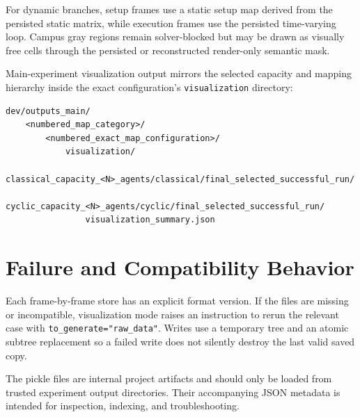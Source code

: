 \documentclass[11pt]{article}
\begin{document}
For dynamic branches, setup frames use a static setup map derived from the persisted static matrix, while execution frames use the persisted time-varying loop. Campus gray regions remain solver-blocked but may be drawn as visually free cells through the persisted or reconstructed render-only semantic mask.

Main-experiment visualization output mirrors the selected capacity and mapping hierarchy inside the exact configuration's \texttt{visualization} directory:
\begin{lstlisting}
dev/outputs_main/
    <numbered_map_category>/
        <numbered_exact_map_configuration>/
            visualization/
                classical_capacity_<N>_agents/classical/final_selected_successful_run/
                cyclic_capacity_<N>_agents/cyclic/final_selected_successful_run/
                visualization_summary.json
\end{lstlisting}

\section{Failure and Compatibility Behavior}

Each frame-by-frame store has an explicit format version. If the files are missing or incompatible, visualization mode raises an instruction to rerun the relevant case with \texttt{to\_generate="raw\_data"}. Writes use a temporary tree and an atomic subtree replacement so a failed write does not silently destroy the last valid saved copy.

The pickle files are internal project artifacts and should only be loaded from trusted experiment output directories. Their accompanying JSON metadata is intended for inspection, indexing, and troubleshooting.
\end{document}
